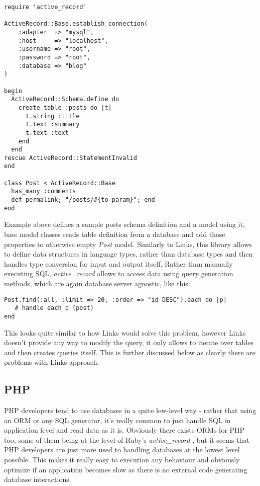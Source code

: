 \begin{codelisting}
\begin{verbatim}
require 'active_record'

ActiveRecord::Base.establish_connection(
    :adapter  => "mysql",
    :host     => "localhost",
    :username => "root",
    :password => "root",
    :database => "blog"
)

begin
  ActiveRecord::Schema.define do
    create_table :posts do |t|
      t.string :title
      t.text :summary
      t.text :text
    end
  end
rescue ActiveRecord::StatementInvalid
end

class Post < ActiveRecord::Base
  has_many :comments
  def permalink; "/posts/#{to_param}"; end
end
\end{verbatim}
\end{codelisting}

Example above defines a sample posts schema definition and a model using it, base model classes reads table definition from a database and add those properties to otherwise empty \textit{Post} model. Similarly to Links, this library allows to define data structures in language types, rather than database types and then handles type conversion for input and output itself. Rather than manually executing SQL, \textit{active\_record} allows to access data using query generation methods, which are again database server agnostic, like this:

\begin{codelisting}
\begin{verbatim}
Post.find(:all, :limit => 20, :order => "id DESC").each do |p|
   # handle each p (post)
end
\end{verbatim}
\end{codelisting}

This looks quite similar to how Links would solve this problem, however Links doesn't provide any way to modify the query, it only allows to iterate over tables and then creates queries itself. This is further discussed below as clearly there are problems with Links approach. 

\subsection{PHP}

PHP developers tend to use databases in a quite low-level way - rather that using an ORM or any SQL generator, it's really common to just handle SQL in application level and read data as it is. Obviously there exists ORMs for PHP too, some of them being at the level of Ruby's \textit{active\_record} , but it seems that PHP developers are just more used to handling databases at the lowest level possible. This makes it really easy to execution any behaviour and obviously optimize if an application becomes slow as there is no external code generating database interactions.


